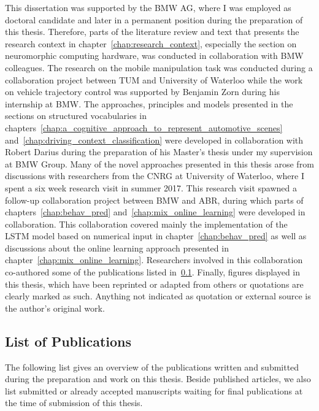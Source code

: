 This dissertation was supported by the \ac{BMW} AG, where I was employed as doctoral candidate and later in a permanent position during the preparation of this thesis.
Therefore, parts of the literature review and text that presents the research context in chapter~\ref{chap:research_context}, especially the section on neuromorphic computing hardware, was conducted in collaboration with \ac{BMW} colleagues.
The research on the mobile manipulation task was conducted during a collaboration project between \ac{TUM} and University of Waterloo while the work on vehicle trajectory control was supported by Benjamin Zorn during his internship at \ac{BMW}.
The approaches, principles and models presented in the sections on structured vocabularies in chapters~\ref{chap:a_cognitive_approach_to_represent_automotive_scenes} and~\ref{chap:driving_context_classification} were developed in collaboration with Robert Darius during the preparation of his Master's thesis \parencite{Darius2018} under my supervision at \ac{BMW} Group.
Many of the novel approaches presented in this thesis arose from discussions with researchers from the \ac{CNRG} at University of Waterloo, where I spent a six week research visit in summer 2017.
This research visit spawned a follow-up collaboration project between \ac{BMW} and \acf{ABR}, during which parts of chapters~\ref{chap:behav_pred} and~\ref{chap:mix_online_learning} were developed in collaboration.
This collaboration covered mainly the implementation of the \ac{LSTM} model based on numerical input in chapter~\ref{chap:behav_pred} as well as discussions about the online learning approach presented in chapter~\ref{chap:mix_online_learning}.
Researchers involved in this collaboration co-authored some of the publications listed in~\ref{subsec:list_of_publications}.
Finally, figures displayed in this thesis, which have been reprinted or adapted from others or quotations are clearly marked as such.
Anything not indicated as quotation or external source is the author's original work.

\subsection{List of Publications}%
\label{subsec:list_of_publications}

The following list gives an overview of the publications written and submitted during the preparation and work on this thesis.
Beside published articles, we also list submitted or already accepted manuscripts waiting for final publications at the time of submission of this thesis.

